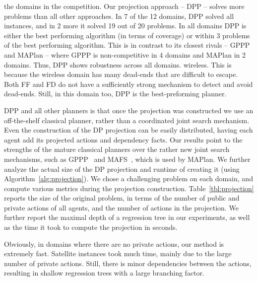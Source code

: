 \documentclass[letterpaper]{article}
\theoremstyle{definition}
\begin{document}
the domains in the competition. Our projection approach -- DPP -- solves more problems than all other approaches. In 7 of the 12 domains, DPP solved all instances, and in 2 more it solved 19 out of 20 problems. In all domains DPP is either the best performing algorithm (in terms of coverage) or within 3 problems of the best performing algorithm. This is in contrast to its closest rivals -- GPPP and MAPlan -- where GPPP is non-competitive in 4 domains and MAPlan in 2 domains. Thus, DPP shows robustness across all domains.  wireless. This is because the wireless domain has many dead-ends that are difficult to escape. Both FF and FD do not have a sufficiently strong mechanism to detect and avoid dead-ends. Still, in this domain too, DPP is the best-preforming planner.

DPP and all other planners is that once the projection was constructed we use an off-the-shelf classical planner, rather than a coordinated joint search mechanism. Even the construction of the DP projection can be easily distributed, having each agent add its projected actions and dependency facts.
Our results point to the strengths of the mature classical planners over the rather new joint search mechanisms, such as GPPP~\cite{maliah2014privacyPreserving} and MAFS~\cite{nissim2014distributed}, which is used by MAPlan.  We further analyze the actual size of the DP projection and runtime of creating it (using Algorithm~\ref{alg:projection}). We chose a challenging problem on each domain, and compute various metrics during the projection construction.  Table~\ref{tbl:projection} reports the size of the original problem, in terms of the number of public and private actions of all agents, and the number of actions in the projection. We further report the maximal depth of a regression tree in our experiments, as well as the time it took to compute the projection in seconds.

Obviously, in domains where there are no private actions, our method is extremely fast.
Satellite instances took much time, mainly due to the large number of private actions. Still, there is minor dependencies between the actions, resulting in shallow regression trees with a large branching factor.
\end{document}
